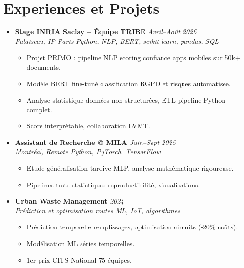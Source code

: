 \documentclass[a4paper,11pt]{article}
\begin{document}
\section{Experiences et Projets}
\begin{itemize}[leftmargin=0.5cm, nosep]

    \item \textbf{Stage INRIA Saclay -- \'Equipe TRIBE} \hfill \textit{Avril--Ao\^ut 2026} \\
    \textit{Palaiseau, IP Paris} \hfill \textit{Python, NLP, BERT, scikit-learn, pandas, SQL}
    \vspace{-2pt}
    \begin{itemize}[leftmargin=0.4cm, nosep, label=\tiny$\bullet$]
        \item \small{Projet PRIMO : pipeline NLP scoring confiance apps mobiles sur 50k+ documents.}
        \item \small{Mod\`ele BERT fine-tun\'e classification RGPD et risques automatisée.}
        \item \small{Analyse statistique donn\'ees non structur\'ees, ETL pipeline Python complet.}
        \item \small{Score interpr\'etable, collaboration LVMT.}
    \end{itemize}
    \vspace{3pt}

    \item \textbf{Assistant de Recherche @ MILA} \hfill \textit{Juin--Sept 2025} \\
    \textit{Montr\'eal, Remote} \hfill \textit{Python, PyTorch, TensorFlow}
    \vspace{-2pt}
    \begin{itemize}[leftmargin=0.4cm, nosep, label=\tiny$\bullet$]
        \item \small{Etude g\'en\'eralisation tardive MLP, analyse math\'ematique rigoureuse.}
        \item \small{Pipelines tests statistiques reproductibilit\'e, visualisations.}
    \end{itemize}
    \vspace{3pt}

    \item \textbf{Urban Waste Management} \hfill \textit{2024} \\
    \textit{Pr\'ediction et optimisation routes} \hfill \textit{ML, IoT, algorithmes}
    \vspace{-2pt}
    \begin{itemize}[leftmargin=0.4cm, nosep, label=\tiny$\bullet$]
        \item \small{Pr\'ediction temporelle remplissages, optimisation circuits (-20\% co\^uts).}
        \item \small{Mod\'elisation ML s\'eries temporelles.}
        \item \small{1er prix CITS National 75 \'equipes.}
    \end{itemize}
    \vspace{3pt}


\end{itemize}
\end{document}

